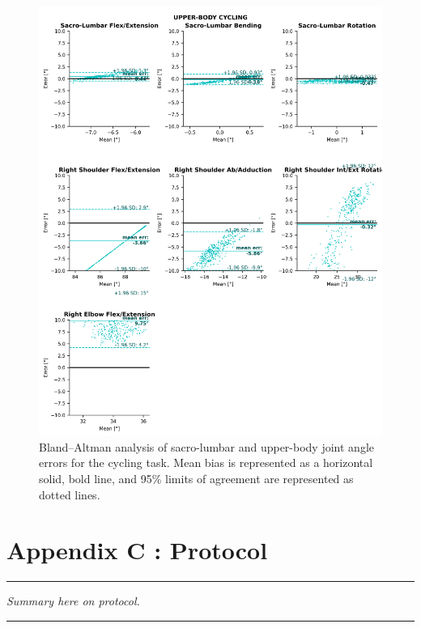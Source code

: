 \begin{figure}[!ht]
	\centering
	\def\svgwidth{1\columnwidth}
	\fontsize{10pt}{10pt}\selectfont
	\includegraphics[height=\dimexpr\textheight-119pt]{"../Annexes/Figures/Fig_BlandBikeUp.png"}
	\caption{Bland–Altman analysis of sacro-lumbar and upper-body joint angle errors for the cycling task. Mean bias is represented as a horizontal solid, bold line, and 95\% limits of agreement are represented as dotted lines.}
	\label{fig_blandbikeup}
\end{figure}


\FloatBarrier
\chapter{Appendix C : Protocol}
\label{Ann:3}


\begin{center}
\rule{0.7\linewidth}{.5pt}
\begin{minipage}{0.7\linewidth}
\smallskip

\textit{Summary here on protocol.
}

\end{minipage}
\smallskip
\rule{0.7\linewidth}{.5pt}
\end{center}


